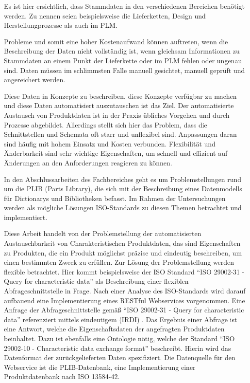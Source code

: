 Es ist hier ersichtlich, dass Stammdaten in den verschiedenen Bereichen benötigt werden. Zu nennen seien beispielsweise die Lieferketten, Design und Herstellungprozesse als auch im \gls{PLM}.     

Probleme und somit eine hoher Kostenaufwand können auftreten, wenn die Beschreibung der Daten nicht vollständig ist, wenn gleichsam Informationen zu Stammdaten an einem Punkt der Lieferkette oder im \gls{PLM} fehlen oder ungenau sind. Daten müssen im schlimmsten Falle manuell gesichtet, manuell geprüft und angereichert werden.  

Diese Daten in Konzepte zu beschreiben, diese Konzepte verfügbar zu machen und diese Daten automatisiert auszutauschen ist das Ziel. Der automatisierte Austausch von Produktdaten ist in der Praxis übliches Vorgehen und durch Prozesse abgebildet. Allerdings stellt sich hier das Problem, dass die Schnittstellen und Schemata oft starr und unflexibel sind. Anpassungen daran sind häufig mit hohem Einsatz und Kosten verbunden. Flexibilität und Änderbarkeit sind sehr wichtige Eigenschaften, um schnell und effizient auf Änderungen an den Anforderungen reagieren zu können. 

In den Abschlussarbeiten des Fachbereiches geht es um Problemstellungen rund um die \gls{PLIB} (Parts Library), die sich mit der Beschreibung eines Datenmodells für \glspl{Dictionary} und Bibliotheken befasst. Im Rahmen der Untersuchungen werden als mögliche Lösungen ISO-Standards zu diesen Themen betrachtet und implementiert. 

Diese Arbeit handelt von der Problemstellung der automatisierten Austauschbarkeit von Charakteristischen Produktdaten, das sind Eigenschaften zu Produkten, die ein Produkt möglichst präzise und eindeutig beschreiben, um einen bestimmten Zweck zu erfüllen. Zur Lösung der Problemstellung werden flexible  betrachtet. Hier kommt beispielsweise der ISO Standard \enquote{ISO 29002-31 - Query for characteristic data} als Beschreibung einer flexiblen \gls{Abfrageschnittstelle} in Frage. Nach einer Analyse des ISO-Standards wird darauf aufbauend eine Implementierung eines \gls{REST}ful \glspl{Webservice} vorgenommen. 
Eine Anfrage der \gls{Abfrageschnittstelle} gemäß \enquote{ISO 29002-31 - Query for characteristic data} referenziert mittels eindeutigem  (IRDI) . Das Ergebnis einer Abfrage ist eine Antwort, welche die Eigenschaftsdaten der angefragten Produktdaten beinhaltet. Dazu ist ebenfalls eine Ontologie nötig, welche der Standard \enquote{ISO 29002-10 - Characteristic data exchange format} beschreibt. Hierin wird das Datenformat der zurückgelieferten Daten spezifiziert. Die Datenquelle für den Webservice ist die PLIB-Datenbank, eine Implementierung einer Produktdatenbank nach ISO 13584-42. 

